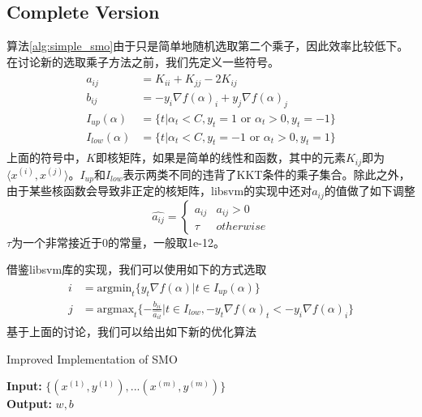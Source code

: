 \documentclass[11pt]{article}
\begin{document}
\subsection{Complete Version}
算法\ref{alg:simple_smo}由于只是简单地随机选取第二个乘子，因此效率比较低下。在讨论新的选取乘子方法之前，我们先定义一些符号。
\begin{align}
\begin{split}
a_{ij} &= K_{ii}+K_{jj} - 2K_{ij}\\
b_{ij} &= -y_i\nabla f(\alpha)_i + y_j\nabla f(\alpha)_j\\
I_{up}(\alpha) &= \{t|\alpha_t < C, y_t=1\text{ or }\alpha_t > 0, y_t=-1\}\\
I_{low}(\alpha) &= \{t|\alpha_t < C, y_t=-1\text{ or }\alpha_t > 0, y_t=1\}
\end{split}
\end{align}
上面的符号中，$K$即核矩阵，如果是简单的线性和函数，其中的元素$K_{ij}$即为$\langle x^{(i)}, x^{(j)}\rangle$。$I_{up}$和$I_{low}$表示两类不同的违背了KKT条件的乘子集合。除此之外，由于某些核函数会导致非正定的核矩阵，libsvm的实现中还对$a_{ij}$的值做了如下调整
\begin{equation}
\hat{a_{ij}} = \begin{cases}
a_{ij} & a_{ij} > 0\\
\tau & otherwise
\end{cases}
\end{equation}
$\tau$为一个非常接近于0的常量，一般取1e-12。

借鉴libsvm库的实现，我们可以使用如下的方式选取
\begin{align}\label{eq:chooseij}
\begin{split}
i &= \text{argmin}_t\{y_t\nabla f(\alpha)|t\in I_{up}(\alpha)\}\\
j &= \text{argmax}_t\{-\frac{b_{ii}}{\hat{a_{it}}}|t\in I_{low},-y_t\nabla f(\alpha)_t < -y_i\nabla f(\alpha)_i\}
\end{split}
\end{align}
基于上面的讨论，我们可以给出如下新的优化算法
\begin{algorithm}[H] 
	\caption{Improved Implementation of SMO}
	\label{alg:complete_smo}
	\textbf{Input:} $\{(x^{(1)}, y^{(1)}),...(x^{(m)}, y^{(m)})\}$\\
	\textbf{Output:} $w, b$
	\begin{algorithmic}[1]
		\Statex
		\EndIf
		\EndWhile
	\end{algorithmic}
\end{algorithm}
\end{document}
